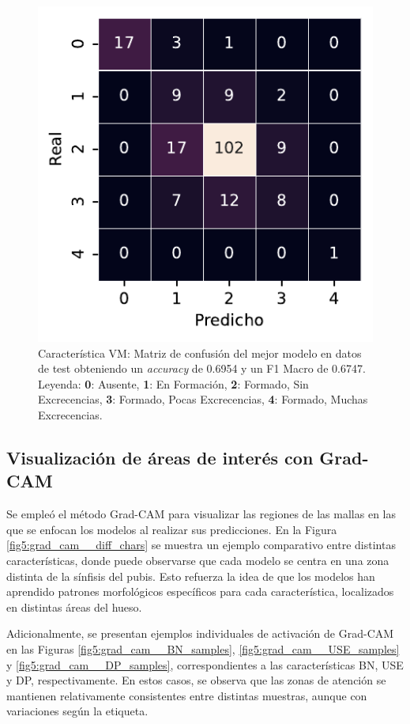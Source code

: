 \begin{figure}[htbp]
    \vspace{1.5em} %

    \includegraphics[width=0.6\linewidth]{figures/5_experiments/single-vm-cm.pdf}
    \caption[Característica VM: Matriz de confusión del mejor modelo en datos de test.]{Característica VM: Matriz de confusión del mejor modelo en datos de test obteniendo un \textit{accuracy} de 0.6954 y un F1 Macro de 0.6747. Leyenda: \textbf{0}: Ausente, \textbf{1}: En Formación, \textbf{2}: Formado, Sin Excrecencias, \textbf{3}: Formado, Pocas Excrecencias, \textbf{4}: Formado, Muchas Excrecencias.}
    \label{fig5:VM_confusion_matrix}
\end{figure}

\FloatBarrier

\subsection{Visualización de áreas de interés con Grad-CAM}
\label{gradcam_analysis}

Se empleó el método Grad-CAM para visualizar las regiones de las mallas en las que se enfocan los modelos al realizar sus predicciones. En la Figura \ref{fig5:grad_cam__diff_chars} se muestra un ejemplo comparativo entre distintas características, donde puede observarse que cada modelo se centra en una zona distinta de la sínfisis del pubis. Esto refuerza la idea de que los modelos han aprendido patrones morfológicos específicos para cada característica, localizados en distintas áreas del hueso. 

Adicionalmente, se presentan ejemplos individuales de activación de Grad-CAM en las Figuras \ref{fig5:grad_cam__BN_samples}, \ref{fig5:grad_cam__USE_samples} y \ref{fig5:grad_cam__DP_samples}, correspondientes a las características BN, USE y DP, respectivamente. En estos casos, se observa que las zonas de atención se mantienen relativamente consistentes entre distintas muestras, aunque con variaciones según la etiqueta.

